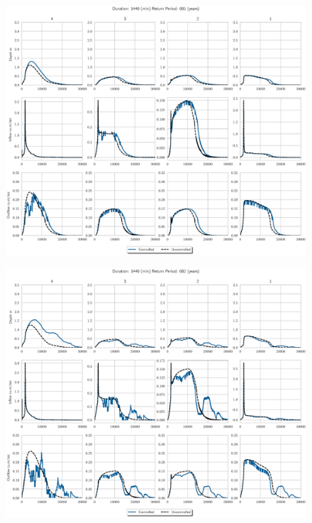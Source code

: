 \begin{figure}
    \centering
    \includegraphics[width=\linewidth]{./RL-SI-figures/77storms/1440001.eps}
\end{figure}
\begin{figure}
    \centering
    \includegraphics[width=\linewidth]{./RL-SI-figures/77storms/1440002.eps}
\end{figure}
